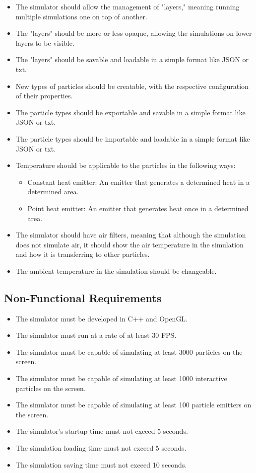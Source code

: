 \documentclass{article}
\begin{document}
\begin{itemize}
    \item The simulator should allow the management of "layers," meaning running multiple simulations one on top of another.
    \item The "layers" should be more or less opaque, allowing the simulations on lower layers to be visible.
    \item The "layers" should be savable and loadable in a simple format like JSON or txt.
    \item New types of particles should be creatable, with the respective configuration of their properties.
    \item The particle types should be exportable and savable in a simple format like JSON or txt.
    \item The particle types should be importable and loadable in a simple format like JSON or txt.
    \item Temperature should be applicable to the particles in the following ways:
    \begin{itemize}
        \item Constant heat emitter: An emitter that generates a determined heat in a determined area.
        \item Point heat emitter: An emitter that generates heat once in a determined area.
    \end{itemize}
    \item The simulator should have air filters, meaning that although the simulation does not simulate air, it should show the air temperature in the simulation and how it is transferring to other particles.
    \item The ambient temperature in the simulation should be changeable.
\end{itemize}

\subsection{Non-Functional Requirements}

\begin{itemize}
    \item The simulator must be developed in C++ and OpenGL.
    \item The simulator must run at a rate of at least 30 FPS.
    \item The simulator must be capable of simulating at least 3000 particles on the screen.
    \item The simulator must be capable of simulating at least 1000 interactive particles on the screen.
    \item The simulator must be capable of simulating at least 100 particle emitters on the screen.
    \item The simulator's startup time must not exceed 5 seconds.
    \item The simulation loading time must not exceed 5 seconds.
    \item The simulation saving time must not exceed 10 seconds.
\end{itemize}
\end{document}
